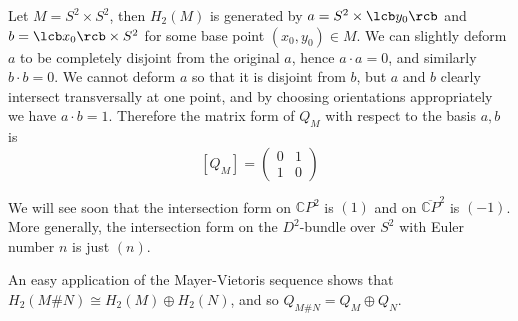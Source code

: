 \begin{example}
Let $M = S^2 \times S^2$, then $H_2(M)$ is generated by $a = S^2 \times \lcb y_0 \rcb$ and $b = \lcb x_0 \rcb \times S^2$ for some base point $(x_0,y_0) \in M$. We can slightly deform $a$ to be completely disjoint from the original $a$, hence $a \cdot a = 0$, and similarly $b \cdot b = 0$. We cannot deform $a$ so that it is disjoint from $b$, but $a$ and $b$ clearly intersect transversally at one point, and by choosing orientations appropriately we have $a \cdot b = 1$. Therefore the matrix form of $Q_M$ with respect to the basis $a,b$ is
\[ [Q_M] = \begin{pmatrix} 0 & 1 \\ 1 & 0 \end{pmatrix} \]
\end{example}

\begin{example}
We will see soon that the intersection form on $\mathbb CP^2$ is $(1)$ and on $\overline{\mathbb CP}^2$ is $(-1)$. More generally, the intersection form on the $D^2$-bundle over $S^2$ with Euler number $n$ is just $(n)$. 
\end{example}

\begin{example}
An easy application of the Mayer-Vietoris sequence shows that $H_2(M \# N) \cong H_2(M) \oplus H_2(N)$, and so $Q_{M \# N} = Q_M \oplus Q_N$.
\end{example}


